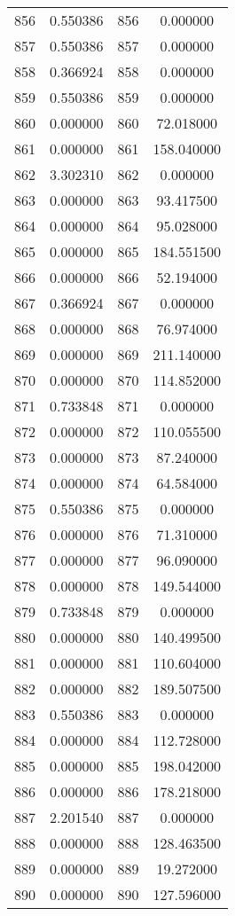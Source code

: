 \documentclass[12pt]{article}
\begin{document}
\begin{longtable}{@{}cccc@{}}
856 & 0.550386 & 856 & 0.000000 \\
857 & 0.550386 & 857 & 0.000000 \\
858 & 0.366924 & 858 & 0.000000 \\
859 & 0.550386 & 859 & 0.000000 \\
860 & 0.000000 & 860 & 72.018000 \\
861 & 0.000000 & 861 & 158.040000 \\
862 & 3.302310 & 862 & 0.000000 \\
863 & 0.000000 & 863 & 93.417500 \\
864 & 0.000000 & 864 & 95.028000 \\
865 & 0.000000 & 865 & 184.551500 \\
866 & 0.000000 & 866 & 52.194000 \\
867 & 0.366924 & 867 & 0.000000 \\
868 & 0.000000 & 868 & 76.974000 \\
869 & 0.000000 & 869 & 211.140000 \\
870 & 0.000000 & 870 & 114.852000 \\
871 & 0.733848 & 871 & 0.000000 \\
872 & 0.000000 & 872 & 110.055500 \\
873 & 0.000000 & 873 & 87.240000 \\
874 & 0.000000 & 874 & 64.584000 \\
875 & 0.550386 & 875 & 0.000000 \\
876 & 0.000000 & 876 & 71.310000 \\
877 & 0.000000 & 877 & 96.090000 \\
878 & 0.000000 & 878 & 149.544000 \\
879 & 0.733848 & 879 & 0.000000 \\
880 & 0.000000 & 880 & 140.499500 \\
881 & 0.000000 & 881 & 110.604000 \\
882 & 0.000000 & 882 & 189.507500 \\
883 & 0.550386 & 883 & 0.000000 \\
884 & 0.000000 & 884 & 112.728000 \\
885 & 0.000000 & 885 & 198.042000 \\
886 & 0.000000 & 886 & 178.218000 \\
887 & 2.201540 & 887 & 0.000000 \\
888 & 0.000000 & 888 & 128.463500 \\
889 & 0.000000 & 889 & 19.272000 \\
890 & 0.000000 & 890 & 127.596000 \\

\end{longtable}
\end{document}
